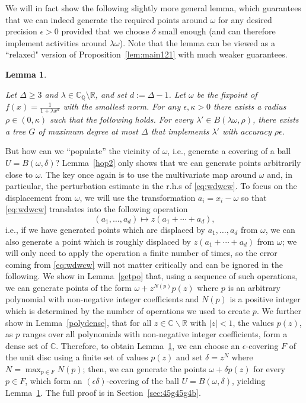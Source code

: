 \documentclass[11pt]{article}
\newtheorem{lemma}[theorem]{Lemma}
\def\Reals{\mathbb{R}}
\def\Complex{\mathbb{C}}
\def\CQ{\mathbb{C}_{\mathbb{Q}}}
\newcommand{\eps}{\epsilon}
\begin{document}
We will in fact show the following slightly more general lemma, which guarantees that we can indeed generate the required points around $\omega$ for any desired precision $\epsilon>0$ provided that we choose $\delta$ small enough (and can therefore implement activities around $\lambda \omega$). Note that the lemma can be viewed as a ``relaxed" version of  Proposition~\ref{lem:main121} with much weaker guarantees.


\newcommand{\statelemmaopoptwo}{
Let $\Delta\geq 3$ and $\lambda\in \CQ\setminus\Reals$, and set $d:=\Delta-1$. Let $\omega$ be the fixpoint of $f(x)=\frac{1}{1+\lambda x^{d}}$ with the smallest norm. For any $\eps,\kappa>0$ there exists  a radius $\rho\in (0,\kappa)$ such that the following holds. 
For every $\lambda'\in B(\lambda\omega,\rho)$, there exists a tree $G$ of maximum degree at most  $\Delta$ that implements $\lambda'$ with accuracy $\rho\epsilon$.  
}
\begin{lemma}\label{opop2}
\statelemmaopoptwo
\end{lemma}

But how can we ``populate'' the vicinity of $\omega$, i.e., generate a covering of a ball $U=B(\omega,\delta)$? Lemma~\ref{hop2} only  shows that we can generate points arbitrarily close to $\omega$. The key once again is to use the multivariate map around $\omega$ and, in particular, the perturbation estimate in the r.h.s of \eqref{eq:wdwcw}. To focus on the displacement from $\omega$, we will use the transformation $a_i=x_i-\omega$ so that \eqref{eq:wdwcw} translates into the following operation
\[(a_1,\hdots,a_d)\mapsto z(a_1+\cdots+a_d),\]
i.e., if we have generated points which are displaced by $a_1,\hdots,a_d$ from $\omega$, we can also generate a point which is roughly displaced by $z(a_1+\cdots+a_d)$ from $\omega$; we will only need to apply the operation a finite number of times, so the error coming from \eqref{eq:wdwcw} will not matter critically and can be ignored in the following. We show in Lemma~\ref{getpo} that, using a sequence of such operations, we can generate points   of the form $\omega+z^{N(p)}p(z)$ where $p$ is an arbitrary polynomial with non-negative integer coefficients and $N(p)$ is a positive integer which is determined by the number of operations we used to create $p$. We further show in Lemma~\ref{polydense}, that for all $z\in \Complex\backslash \Reals$ with $|z|<1$, the values $p(z)$, as $p$ ranges over all
polynomials  with non-negative integer coefficients, form a dense set of $\Complex$. Therefore, to obtain Lemma~\ref{opop2}, we can choose an $\epsilon$-covering $F$ of the unit disc using a finite set of values $p(z)$ and set $\delta=z^N$ where $N=\max_{p\in F}{N(p)}$; then, we can generate the points $\omega+\delta p(z)$ for every $p\in F$, which form an $(\epsilon \delta)$-covering of the ball $U=B(\omega,\delta)$, yielding  Lemma~\ref{opop2}.
The full proof is in Section~\ref{sec:45g45g4b}.
\end{document}
